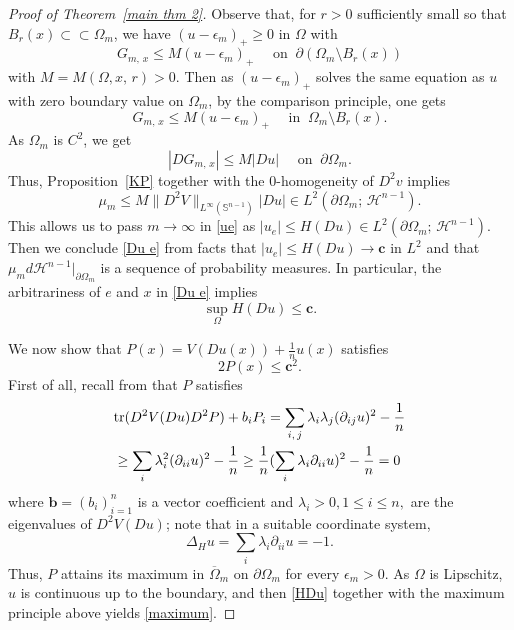 \documentclass[reqno,11pt]{amsart}
\def\ez{\epsilon}
\numberwithin{equation}{section}
\theoremstyle{remark}
\begin{document}
\begin{proof}[Proof of Theorem~\ref{main thm 2}]
Observe that, for $r>0$ sufficiently small so that $B_r(x)\subset \subset \Omega_m$, we have $(u -\ez_m)_+\ge 0$ in $\Omega$ with
$$G_{m,\,x}\le M(u-\ez_m)_+ \quad \text{ on } \ \partial(\Omega_m\setminus B_r(x))$$
with $M=M(\Omega,x,\,r)>0$. Then as $(u-\ez_m)_+$ solves the same equation as $u$ with  zero boundary value on $\Omega_m$, by the comparison principle, one gets
$$G_{m,\,x}\le M(u-\ez_m)_+ \quad \text{ in } \ \Omega_m\setminus B_r(x).$$
As $\Omega_m$ is $C^2$, we get
$$|DG_{m,\,x}|\le M|Du| \quad \text{ on } \ \partial \Omega_m. $$
Thus, Proposition~\ref{KP} together with the $0$-homogeneity of $D^2v$ implies 
$$\mu_m\le M\|D^2V\|_{L^\infty(\mathbb S^{n-1})} |Du|\in L^2(\partial\Omega_m;\,\mathscr H^{n-1}). $$ 
This allows us to pass $m\to \infty$ in \eqref{ue} as $|u_e|\le H(Du)\in L^2(\partial\Omega_m;\,\mathscr H^{n-1})$. Then we conclude \eqref{Du e} from facts that $|u_e|\le H(Du)\to \mathbf c$ in $L^2$ and that $\mu_md\mathscr H^{n-1}|_{\partial\Omega_m}$ is a sequence of probability measures.
In particular, the arbitrariness of $e$ and $x$ in \eqref{Du e} implies
\begin{equation}\label{HDu}
    \sup_{\Omega} H(Du)\le \mathbf c. 
\end{equation}

We now show that $P(x)=  V(Du(x)) +\frac{1}{n}u(x)$ satisfies 
\begin{equation}\label{maximum}
    2P(x)\le \mathbf{c}^2. 
\end{equation}
First of all, recall from \cite[Theorem 4 \& Formula (31)]{WX2011} that $P$ satisfies
\begin{equation}\label{P}
\begin{aligned}
    &{\rm tr} (D^2V(Du) D^2P) + b_i P_i=\sum_{i,\,j}\lambda_i\lambda_j(\partial_{ij} u)^2 - \frac  1n\\
    &\ge  \sum_{i}\lambda_i^2(\partial_{ii} u)^2 - \frac 1 n \ge \frac 1 n  (\sum_i\lambda_i\partial_{ii}u)^2- \frac 1 n=0 
\end{aligned}
    \end{equation}
where $\mathbf{b}= (b_i)_{i=1}^n$ is a vector coefficient and $\lambda_i>0, 1\le i\le n,$ are the eigenvalues of $D^2V(Du)$; note that  in a suitable coordinate system, 
$$\Delta _Hu = \sum_i\lambda_i\partial_{ii}u=-1. $$ 
Thus, $P$ attains its maximum in $\overline{\Omega}_m$ on $\partial\Omega_m$ for every $\ez_m>0$. 
As $\Omega$ is Lipschitz, $u$ is continuous up to the boundary, and  then \eqref{HDu} together with the maximum principle above yields \eqref{maximum}.  


\end{proof}
\end{document}
